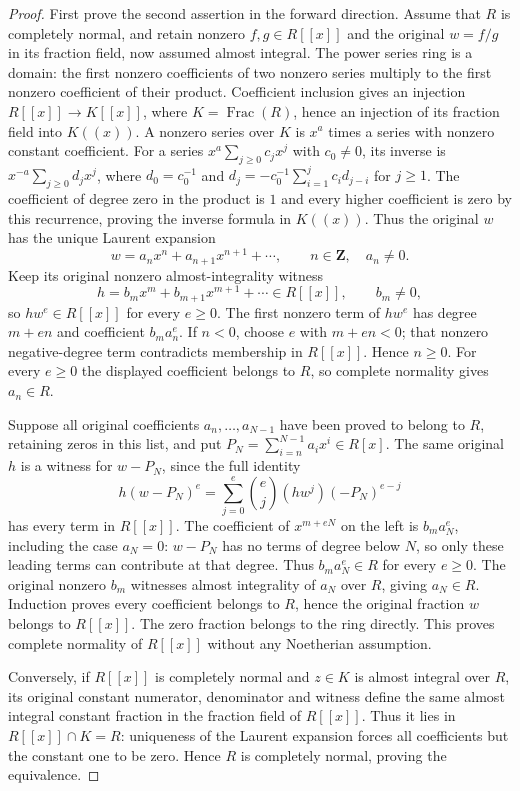 \begin{proof}
First prove the second assertion in the forward direction.
Assume that $R$ is completely normal, and retain nonzero
$f,g\in R[[x]]$ and the original $w=f/g$ in its fraction field,
now assumed almost integral. The power series ring is a domain:
the first nonzero coefficients of two nonzero series multiply
to the first nonzero coefficient of their product. Coefficient
inclusion gives an injection $R[[x]]\to K[[x]]$, where
$K=\operatorname{Frac}(R)$, hence an injection of its fraction
field into $K((x))$. A nonzero series over $K$ is $x^a$ times
a series with nonzero constant coefficient. For a series
$x^a\sum_{j\geq0}c_jx^j$ with $c_0\ne0$, its inverse is
$x^{-a}\sum_{j\geq0}d_jx^j$, where
$d_0=c_0^{-1}$ and
$d_j=-c_0^{-1}\sum_{i=1}^j c_id_{j-i}$ for $j\geq1$.
The coefficient of degree zero in the product is $1$ and every
higher coefficient is zero by this recurrence, proving the
inverse formula in $K((x))$. Thus the
original $w$ has the unique Laurent expansion
$$
w=a_nx^n+a_{n+1}x^{n+1}+\cdots,
\qquad n\in\mathbf Z,\quad a_n\ne0.
$$
Keep its original nonzero almost-integrality witness
$$
h=b_mx^m+b_{m+1}x^{m+1}+\cdots\in R[[x]],
\qquad b_m\ne0,
$$
so $hw^e\in R[[x]]$ for every $e\geq0$.
The first nonzero term of $hw^e$ has degree $m+en$ and
coefficient $b_ma_n^e$. If $n<0$, choose $e$ with $m+en<0$;
that nonzero negative-degree term contradicts membership in
$R[[x]]$. Hence $n\geq0$. For every $e\geq0$ the displayed
coefficient belongs to $R$, so complete normality gives $a_n\in R$.

Suppose all original coefficients $a_n,\ldots,a_{N-1}$ have
been proved to belong to $R$, retaining zeros in this list, and
put $P_N=\sum_{i=n}^{N-1}a_ix^i\in R[x]$.
The same original $h$ is a witness for $w-P_N$, since the full
identity
$$
h(w-P_N)^e=\sum_{j=0}^e\binom ej(hw^j)(-P_N)^{e-j}
$$
has every term in $R[[x]]$. The coefficient of $x^{m+eN}$
on the left is $b_ma_N^e$, including the case $a_N=0$:
$w-P_N$ has no terms of degree below $N$, so only these leading
terms can contribute at that degree. Thus $b_ma_N^e\in R$
for every $e\geq0$. The original nonzero $b_m$ witnesses
almost integrality of $a_N$ over $R$, giving $a_N\in R$.
Induction proves every coefficient belongs to $R$, hence the
original fraction $w$ belongs to $R[[x]]$. The zero fraction
belongs to the ring directly. This proves complete normality
of $R[[x]]$ without any Noetherian assumption.

Conversely, if $R[[x]]$ is completely normal and $z\in K$ is
almost integral over $R$, its original constant numerator,
denominator and witness define the same almost integral constant
fraction in the fraction field of $R[[x]]$. Thus it lies in
$R[[x]]\cap K=R$: uniqueness of the Laurent expansion forces
all coefficients but the constant one to be zero. Hence $R$
is completely normal, proving the equivalence.


\end{proof}

